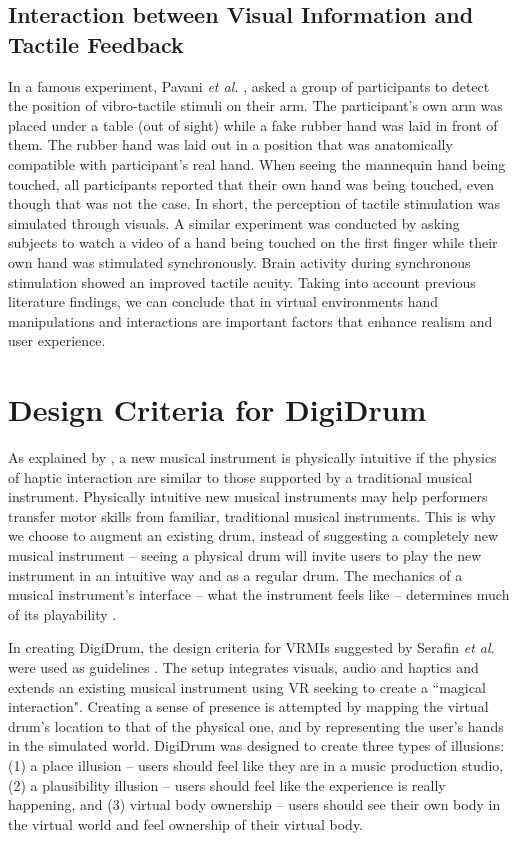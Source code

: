     \subsection{Interaction between Visual Information and Tactile Feedback}
    In a famous experiment, Pavani \emph{et al.} \cite{Pavani2000},  asked a group of participants to detect the position of vibro-tactile stimuli on their arm. The participant's own arm was placed under a table (out of sight) while a fake rubber hand was laid in front of them. The rubber hand was laid out in a position that was anatomically compatible with participant's real hand. When seeing the mannequin hand being touched, all participants reported that their own hand was being touched, even though that was not the case. In short, the perception of tactile stimulation was simulated through visuals. A similar experiment was conducted by \cite{Schaefer2006} asking subjects to watch a video of a hand being touched on the first finger while their own hand was stimulated synchronously. Brain activity during synchronous stimulation showed an improved tactile acuity. Taking into account previous literature findings, we can conclude that in virtual environments hand manipulations and interactions are important factors that enhance realism and user experience. 
    
    \section{Design Criteria for DigiDrum}\label{sec:Design_criteria}
    
    As explained by \cite{Berdahl2007API}, a new musical instrument is physically intuitive if the physics of haptic interaction are similar to those supported by a traditional musical instrument. Physically intuitive new musical instruments may help performers transfer motor skills from familiar, traditional musical instruments. This is why we choose to augment an existing drum, instead of suggesting a completely new musical instrument -- seeing a physical drum will invite users to play the new instrument in an intuitive way and as a regular drum. The mechanics of a musical instrument’s interface -- what the instrument feels like -- determines much of its playability \cite{O'Modhrain:2018}.
    
    In creating DigiDrum, the design criteria for VRMIs suggested by Serafin \emph{et al.} were used as guidelines \cite{Serafin:2016}. The setup integrates visuals, audio and haptics and extends an existing musical instrument using VR seeking to create a ``magical interaction". Creating a sense of presence is attempted by mapping the virtual drum's location to that of the physical one, and by representing the user's hands in the simulated world. DigiDrum was designed to create three types of illusions: (1) a place illusion -- users should feel like they are in a music production studio, (2) a plausibility illusion -- users should feel like the experience is really happening, and (3) virtual body ownership -- users should see their own body in the virtual world and feel ownership of their virtual body.
    
